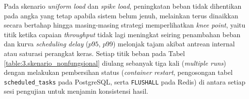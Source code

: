 Pada skenario \textit{uniform load} dan \textit{spike load}, peningkatan beban tidak dihentikan pada angka yang tetap apabila sistem belum jenuh, melainkan terus dinaikkan secara bertahap hingga masing-masing strategi memperlihatkan \textit{knee point}, yaitu titik ketika capaian \textit{throughput} tidak lagi meningkat seiring penambahan beban dan kurva \textit{scheduling delay} ($p95$, $p99$) melonjak tajam akibat antrean internal atau saturasi perangkat keras. Setiap titik beban pada Tabel \ref{table:3.skenario_nonfungsional} diulang sebanyak tiga kali (\textit{multiple runs}) dengan melakukan pembersihan status (\textit{container restart}, pengosongan tabel \texttt{scheduled\_tasks} pada PostgreSQL, serta \texttt{FLUSHALL} pada Redis) di antara setiap sesi pengujian untuk menjamin konsistensi hasil. \par

